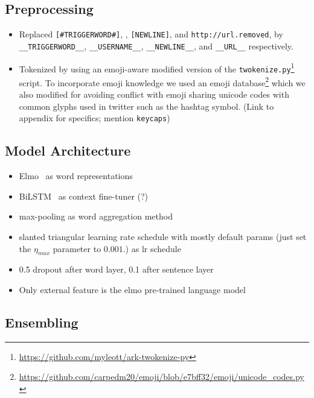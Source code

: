 \documentclass[11pt,a4paper]{article}
\begin{document}
\subsection{Preprocessing}
\begin{itemize}
    \item Replaced \texttt{\footnotesize[\#TRIGGERWORD\#]}, \texttt{\footnotesize@USERNAME},
        \texttt{\footnotesize[NEWLINE]}, and \texttt{\footnotesize http://url.removed}, by
        \texttt{\footnotesize\_\_TRIGGERWORD\_\_}, \texttt{\footnotesize\_\_USERNAME\_\_},
        \texttt{\footnotesize\_\_NEWLINE\_\_}, and
        \texttt{\footnotesize\_\_URL\_\_} respectively.
    \item Tokenized by using an emoji-aware modified version of the
        \texttt{twokenize.py}\footnote{\tiny\url{https://github.com/myleott/ark-twokenize-py}}
        script. To incorporate emoji knowledge we used an emoji
        database\footnote{\tiny\url{https://github.com/carpedm20/emoji/blob/e7bff32/emoji/unicode_codes.py}}
        which we also modified for avoiding conflict with emoji sharing unicode
        codes with common glyphs used in twitter such as the hashtag symbol.
        (Link to appendix for specifics; mention \texttt{keycaps})
\end{itemize}


\subsection{Model Architecture}

\begin{itemize}
    \item Elmo~\cite{peters2018deep} as word representations
    \item BiLSTM~\cite{graves2005framewise, graves2013speech} as context fine-tuner (?)
    \item max-pooling as word aggregation method
    \item slanted triangular learning rate schedule with mostly default params
        (just set the $\eta_{max}$ parameter to $0.001$.)
        as lr schedule~\cite{howard2018universal}
    \item 0.5 dropout after word layer, 0.1 after sentence layer~\cite{srivastava2014dropout}
    \item Only external feature is the elmo pre-trained language model
\end{itemize}

\subsection{Ensembling}
\end{document}
